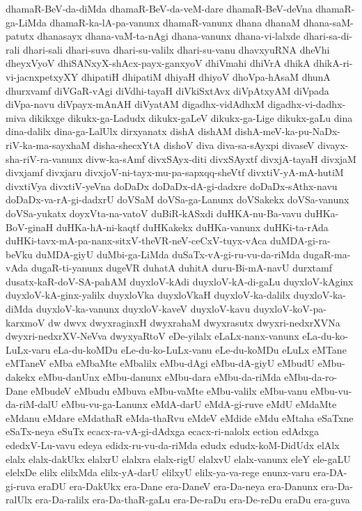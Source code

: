 {dhamaR-BeV-da-diMda
dhamaR-BeV-da-veM-dare
dhamaR-BeV-deVna
dhamaR-ga-LiMda
dhamaR-ka-lA-pa-vanunx
dhamaR-vanunx
dhana
dhanaM
dhana-saM-patutx
dhanasayx
dhana-vaM-ta-nAgi
dhana-vanunx
dhana-vi-lalxde
dhari-sa-di-rali
dhari-sali
dhari-suva
dhari-su-valilx
dhari-su-vanu
dhavxyuRNA
dheVhi
dheyxVyoV
dhiSANxyX-shAcx-payx-ganxyoV
dhiVmahi
dhiVrA
dhikA
dhikA-ri-vi-jacnxpetxyXY
dhipatiH
dhipatiM
dhiyaH
dhiyoV
dhoVpa-hAsaM
dhunA
dhurxvamf
diVGaR-vAgi
diVdhi-tayaH
diVkiSxtAvx
diVpAtxyAM
diVpada
diVpa-navu
diVpayx-mAnAH
diVyatAM
digadhx-vidAdhxM
digadhx-vi-dadhx-miva
dikikxge
dikukx-ga-Ladudx
dikukx-gaLeV
dikukx-ga-Lige
dikukx-gaLu
dina
dina-dalilx
dina-ga-LalUlx
dirxyanatx
dishA
dishAM
dishA-meV-ka-pu-NaDx-riV-ka-ma-sayxhaM
disha-shecxYtA
dishoV
diva
diva-sa-sAyxpi
divaseV
divayx-sha-riV-ra-vanunx
divw-ka-sAmf
divxSAyx-diti
divxSAyxtf
divxjA-tayaH
divxjaM
divxjamf
divxjaru
divxjoV-ni-tayx-mu-pa-sapxqq-sheVtf
divxtiV-yA-mA-hutiM
divxtiVya
divxtiV-yeVna
doDaDx
doDaDx-dA-gi-dadxre
doDaDx-sAthx-navu
doDaDx-va-rA-gi-dadxrU
doVSaM
doVSa-ga-Lanunx
doVSakekx
doVSa-vanunx
doVSa-yukatx
doyxVta-na-vatoV
duBiR-kASxdi
duHKA-nu-Ba-vavu
duHKa-BoV-ginaH
duHKa-hA-ni-kaqtf
duHKakekx
duHKa-vanunx
duHKi-ta-rAda
duHKi-tavx-mA-pa-nanx-sitxV-theVR-neV-ceCxV-tuyx-vAca
duMDA-gi-ra-beVku
duMDA-giyU
duMbi-ga-LiMda
duSaTx-vA-gi-ru-vu-da-riMda
dugaR-ma-vAda
dugaR-ti-yanunx
dugeVR
duhatA
duhitA
duru-Bi-mA-navU
durxtamf
dusatx-kaR-doV-SA-pahAM
duyxloV-kAdi
duyxloV-kA-di-gaLu
duyxloV-kAginx
duyxloV-kA-ginx-yalilx
duyxloVka
duyxloVkaH
duyxloV-ka-dalilx
duyxloV-ka-diMda
duyxloV-ka-vanunx
duyxloV-kaveV
duyxloV-kavu
duyxloV-koV-pa-karxmoV
dw
dwvx
dwyxraginxH
dwyxrahaM
dwyxrasutx
dwyxri-nedxrXVNa
dwyxri-nedxrXV-NeVva
dwyxyaRtoV
eDe-yilalx
eLaLx-nanx-vanunx
eLa-du-ko-LuLx-varu
eLa-du-koMDu
eLe-du-ko-LuLx-vanu
eLe-du-koMDu
eLuLx
eMTane
eMTaneV
eMba
eMbaMte
eMbalilx
eMbu-dAgi
eMbu-dA-giyU
eMbudU
eMbu-dakekx
eMbu-danUnx
eMbu-danunx
eMbu-dara
eMbu-da-riMda
eMbu-da-ro-Dane
eMbudeV
eMbudu
eMbuva
eMbu-vaMte
eMbu-valilx
eMbu-vanu
eMbu-vu-da-riM-dalU
eMbu-vu-ga-Lanunx
eMdA-darU
eMdA-gi-ruve
eMdU
eMdaMte
eMdanu
eMdare
eMdathaR
eMda-thaRvu
eMdeV
eMdide
eMdu
eMtaha
eSaTxne
eSaTx-neya
eSuTx
ecacx-ra-vA-gi-dAdxga
ecacx-ri-nalolx
ection
edAdxga
ededxV-Lu-vavu
edeya
edidx-ru-vu-da-riMda
edudx
edudx-koM-DidUdx
elAlx
elalx
elalx-dakUkx
elalxrU
elalxra
elalx-rigU
elalxvU
elalx-vanunx
eleY
ele-gaLU
elelxDe
elilx
elilxMda
elilx-yA-darU
elilxyU
elilx-ya-va-rege
enunx-varu
era-DA-gi-ruva
eraDU
era-DakUkx
era-Dane
era-DaneV
era-Da-neya
era-Danunx
era-Da-ralUlx
era-Da-ralilx
era-Da-thaR-gaLu
era-De-raDu
era-De-reDu
eraDu
era-guva
}
